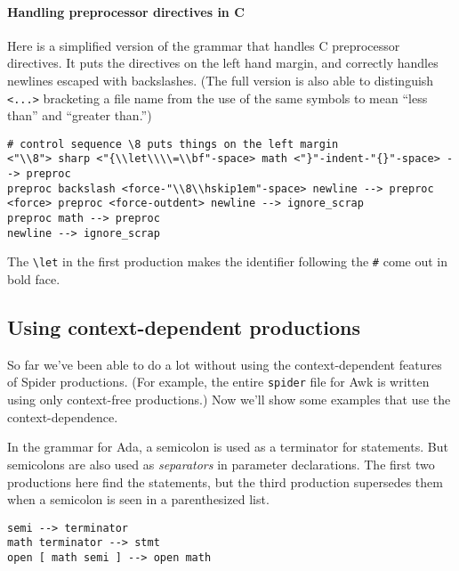 \paragraph{Handling preprocessor directives in C}
Here is a simplified version of 
the grammar that handles C preprocessor directives.
It puts the directives on the left hand margin, and correctly handles
newlines escaped with backslashes.
(The full version is also able to distinguish {\tt <...>}
bracketing a file name from the use of the same symbols to mean ``less
than'' and ``greater than.'')
{\small\advance\hsize 1in
\begin{verbatim}
# control sequence \8 puts things on the left margin
<"\\8"> sharp <"{\\let\\\\=\\bf"-space> math <"}"-indent-"{}"-space> --> preproc
preproc backslash <force-"\\8\\hskip1em"-space> newline --> preproc
<force> preproc <force-outdent> newline --> ignore_scrap
preproc math --> preproc
newline --> ignore_scrap
\end{verbatim}
}
The \verb+\let+ in the first production makes the identifier following
the {\tt \#} come out in bold face.


\subsection{Using context-dependent productions}
So far we've been able to do a lot without using the
context-dependent features of {Spider} productions.
(For example, the entire {\tt spider} file for Awk is written using
only context-free productions.)
Now we'll show some examples that use the context-dependence.

In the grammar for Ada, a semicolon is used as a terminator for
statements.
But semicolons are also used as {\em separators} in parameter
declarations.
The first two productions here find the statements, but the third
production supersedes them when a semicolon is seen in a parenthesized
list.
\begin{verbatim}
semi --> terminator
math terminator --> stmt
open [ math semi ] --> open math
\end{verbatim}


